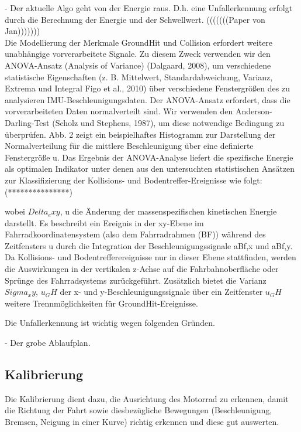 - Der aktuelle Algo geht von der Energie raus. D.h. eine Unfallerkennung erfolgt durch die Berechnung der Energie und der Schwellwert. (((((((Paper von Jan)))))))\\

Die Modellierung der Merkmale GroundHit und Collision erfordert weitere unabhängige vorverarbeitete Signale. Zu diesem Zweck verwenden wir den ANOVA-Ansatz (Analysis of Variance) (Dalgaard, 2008), um verschiedene statistische Eigenschaften (z. B. Mittelwert, Standardabweichung, Varianz, Extrema und Integral Figo et al., 2010) über verschiedene Fenstergrößen des zu analysieren IMU-Beschleunigungsdaten. Der ANOVA-Ansatz erfordert, dass die vorverarbeiteten Daten normalverteilt sind. Wir verwenden den Anderson-Darling-Test (Scholz und Stephens, 1987), um diese notwendige Bedingung zu überprüfen. Abb. 2 zeigt ein beispielhaftes Histogramm zur Darstellung der Normalverteilung für die mittlere Beschleunigung über eine definierte Fenstergröße u. Das Ergebnis der ANOVA-Analyse liefert die spezifische Energie als optimalen Indikator unter denen aus den untersuchten statistischen Ansätzen zur Klassifizierung der Kollisions- und Bodentreffer-Ereignisse wie folgt: (***************) \\ \cite{Schneeclassification2021} %

wobei $Delta_exy$, u die Änderung der massenspezifischen kinetischen Energie darstellt. Es beschreibt ein Ereignis in der xy-Ebene im Fahrradkoordinatensystem (also dem Fahrradrahmen (BF)) während des Zeitfensters u durch die Integration der Beschleunigungssignale aBf,x und aBf,y. Da Kollisions- und Bodentrefferereignisse nur in dieser Ebene stattfinden, werden die Auswirkungen in der vertikalen z-Achse auf die Fahrbahnoberfläche oder Sprünge des Fahrradsystems zurückgeführt. Zusätzlich bietet die Varianz $Sigma_xy$, $u_GH$ der x- und y-Beschleunigungssignale über ein Zeitfenster $u_GH$ weitere Trennmöglichkeiten für GroundHit-Ereignisse. \cite{Schneeclassification2021}




Die Unfallerkennung ist wichtig wegen folgenden Gründen.


- Der grobe Ablaufplan.\\



\subsection{Kalibrierung}
Die Kalibrierung dient dazu, die Ausrichtung des Motorrad zu erkennen, damit die Richtung der Fahrt sowie diesbezügliche Bewegungen (Beschleunigung, Bremsen, Neigung in einer Kurve) richtig erkennen und diese gut auswerten.\\


